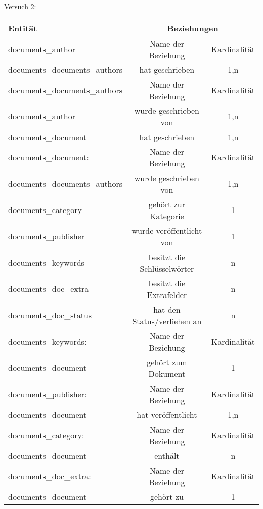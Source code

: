 Versuch 2: \\
\begin{tabular}[ht]{|l||c|c|}
  \hline
  Entit\"at & \multicolumn{2}{c|}{Beziehungen} \\
  \hline\hline\hline
  
  documents\_author  & Name der Beziehung &  Kardinalit\"at\\
  \hline\hline
  documents\_documents\_authors & hat geschrieben & 1,n \\
  \hline\hline\hline
  
  documents\_documents\_authors & Name der Beziehung & Kardinalität\\
  \hline\hline
  documents\_author & wurde geschrieben von & 1,n\\
  \hline
  documents\_document & hat geschrieben & 1,n\\
  \hline\hline\hline
  
  documents\_document: & Name der Beziehung & Kardinalität\\
  \hline\hline
  documents\_documents\_authors & wurde geschrieben von & 1,n\\
  \hline
  documents\_category & gehört zur Kategorie & 1\\
  \hline
  documents\_publisher & wurde veröffentlicht von & 1\\
  \hline
  documents\_keywords & besitzt die Schlüsselwörter & n\\  
  \hline
  documents\_doc\_extra & besitzt die Extrafelder & n\\
  \hline
  documents\_doc\_status & hat den Status/verliehen an & n\\
  \hline\hline\hline
  
  documents\_keywords:  & Name der Beziehung &  Kardinalit\"at\\
  \hline\hline
  documents\_document & gehört zum Dokument & 1 \\
  \hline\hline\hline
  
  documents\_publisher:  & Name der Beziehung &  Kardinalit\"at\\
  \hline\hline
  documents\_document & hat veröffentlicht & 1,n \\
  \hline\hline\hline
  
  documents\_category:  & Name der Beziehung &  Kardinalit\"at\\
  \hline\hline
  documents\_document & enthält & n \\
  \hline\hline\hline
  
  documents\_doc\_extra:  & Name der Beziehung &  Kardinalit\"at\\
  \hline\hline
  documents\_document & gehört zu & 1 \\
  \hline\hline\hline
  

\end{tabular}
